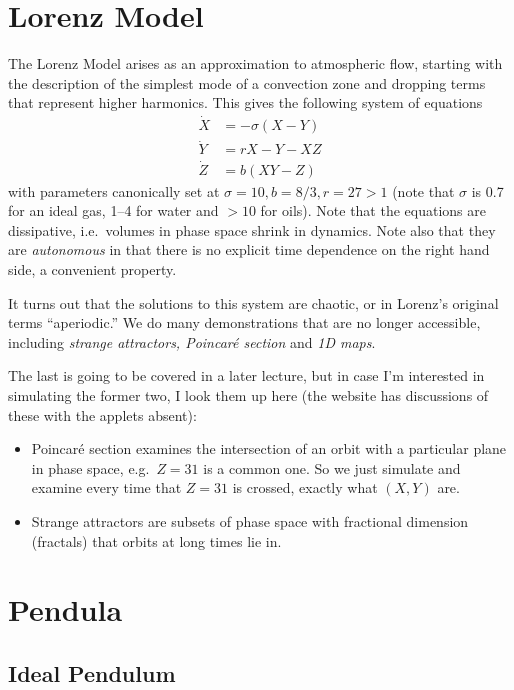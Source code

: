 \documentclass[12pt]{article}
\begin{document}
\section{Lorenz Model}

The Lorenz Model arises as an approximation to atmospheric flow, starting with
the description of the simplest mode of a convection zone and dropping terms
that represent higher harmonics. This gives the following system of equations
\begin{align}
    \dot{X} &= -\sigma(X - Y) \nonumber\\
    \dot{Y} &= rX - Y - XZ \nonumber\\
    \dot{Z} &= b(XY - Z)
\end{align}
with parameters canonically set at $\sigma = 10, b = 8/3, r =27 > 1$ (note that
$\sigma$ is 0.7 for an ideal gas, 1--4 for water and $>10$ for oils). Note that
the equations are dissipative, i.e.\ volumes in phase space shrink in dynamics.
Note also that they are \emph{autonomous} in that there is no explicit time
dependence on the right hand side, a convenient property.

It turns out that the solutions to this system are chaotic, or in Lorenz's
original terms ``aperiodic.'' We do many demonstrations that are no longer
accessible, including \emph{strange attractors, Poincar\'e section} and
\emph{1D maps}.

The last is going to be covered in a later lecture, but in case I'm interested
in simulating the former two, I look them up here (the website has discussions
of these with the applets absent):
\begin{itemize}
    \item Poincar\'e section examines the intersection of an orbit with a
        particular plane in phase space, e.g.\ $Z=31$ is a common one. So we
        just simulate and examine every time that $Z=31$ is crossed, exactly
        what $(X,Y)$ are.
    \item Strange attractors are subsets of phase space with fractional
        dimension (fractals) that orbits at long times lie in.
\end{itemize}

\clearpage

\section{Pendula}

\subsection{Ideal Pendulum}
\end{document}
